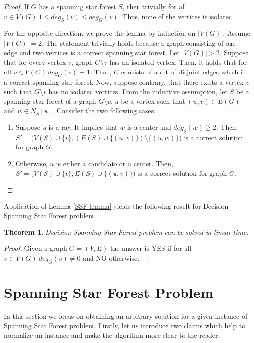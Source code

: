 \documentclass[en]{pracamgr}
\newtheorem{theorem}{Theorem}
\newcommand{\ssf}{spanning star forest}
\newcommand{\ssfp}{{\sc Spanning Star Forest} problem}
\newcommand{\dssfp}{{\sc Decision Spanning Star Forest} problem}
\begin{document}
\begin{proof}
	If $G$ has a \ssf{} $S$, then trivially for all $v \in V(G)\ 1 \leq deg_S(v) \leq deg_G(v)$. Thus, none of the vertices is isolated.
	
	For the opposite direction, we prove the lemma by induction on $|V(G)|$. Assume $|V(G)|=2$. The statement trivially holds because a graph consisting of one edge and two vertices is a correct \ssf{}. Let $|V(G)| >2$. Suppose that for every vertex $v$, graph $G \setminus v$ has an isolated vertex. Then, it holds that for all $v \in V(G)\ deg_G(v)=1$. Thus, $G$ consists of a set of disjoint edges which is a correct \ssf{}. Now, suppose contrary, that there exists a vertex $v$ such that $G \setminus v$ has no isolated vertices. From the inductive assumption, let $S$ be a \ssf{} of a graph $G \setminus v$, $u$ be a vertex such that $(u,v) \in E(G)$ and $w \in N_S[u]$. Consider the two following cases:
	\begin{enumerate}
		\item Suppose $u$ is a ray. It implies that $w$ is a center and $deg_S(w) \geq 2$. Then, $S'=\big(V(S) \cup \{v\},(E(S) \cup \{(u,v)\}) \setminus \{(u,w)\}\big)$ is a correct solution for graph $G$.
		\item Otherwise, $u$ is either a candidate or a center. Then, $S'=\big(V(S) \cup \{v\}, E(S) \cup \{(u,v)\}\big)$ is a correct solution for graph $G$.
	\end{enumerate}
	
\end{proof}
	Application of Lemma \ref{SSF lemma} yields the following result for \dssfp{}.

\begin{theorem}
	\dssfp{} can be solved in linear time.
\end{theorem}

\begin{proof}
	Given a graph $G = (V,E)$ the answer is YES if for all $v \in V(G)\ deg_G(v) \neq 0$ and NO otherwise.
\end{proof}

\section{Spanning Star Forest Problem}

In this section we focus on obtaining an arbitrary solution for a given instance of \ssfp{}. Firstly, let us introduce two claims which help to normalize an instance and make the algorithm more clear to the reader.
\end{document}
